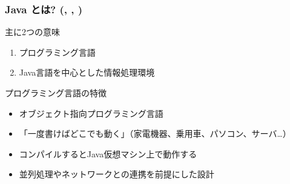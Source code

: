 \documentclass[dvipdfmx]{beamer}
\begin{document}
\begin{frame}
    \frametitle{Java とは? (\cite{java-bible}, \cite{oracle-java}, \cite{java-magazine})}

    \begin{block}{主に2つの意味}
        \begin{enumerate}
         \item プログラミング言語
         \item Java言語を中心とした情報処理環境
        \end{enumerate}
    \end{block}

    \begin{block}{プログラミング言語の特徴}
        \begin{itemize}
            \item オブジェクト指向プログラミング言語
            \item 「一度書けばどこでも動く」（家電機器、乗用車、パソコン、サーバ\dots）
            \item コンパイルするとJava仮想マシン上で動作する
            \item 並列処理やネットワークとの連携を前提にした設計
        \end{itemize}
    \end{block}
\end{frame}
\end{document}
